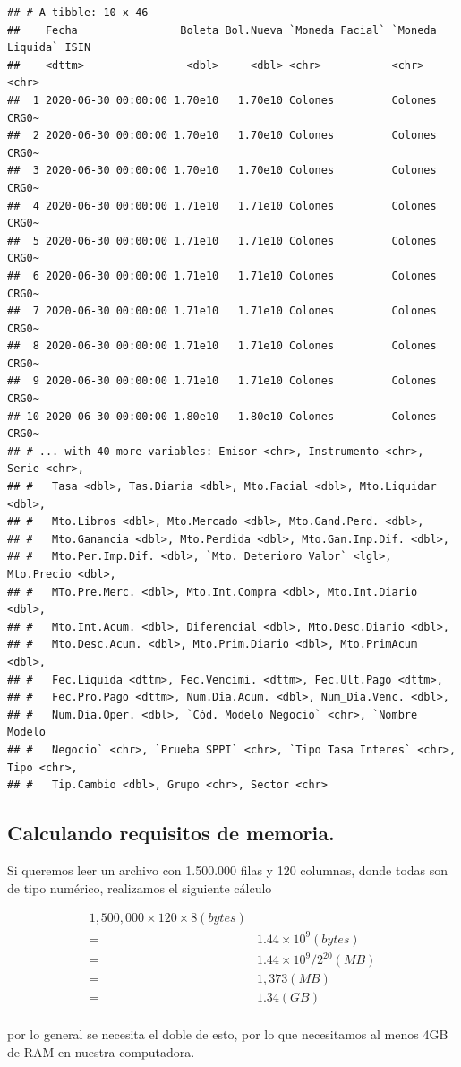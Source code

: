 \documentclass[
  12pt,
]{book}
\begin{document}
\begin{verbatim}
## # A tibble: 10 x 46
##    Fecha                Boleta Bol.Nueva `Moneda Facial` `Moneda Liquida` ISIN 
##    <dttm>                <dbl>     <dbl> <chr>           <chr>            <chr>
##  1 2020-06-30 00:00:00 1.70e10   1.70e10 Colones         Colones          CRG0~
##  2 2020-06-30 00:00:00 1.70e10   1.70e10 Colones         Colones          CRG0~
##  3 2020-06-30 00:00:00 1.70e10   1.70e10 Colones         Colones          CRG0~
##  4 2020-06-30 00:00:00 1.71e10   1.71e10 Colones         Colones          CRG0~
##  5 2020-06-30 00:00:00 1.71e10   1.71e10 Colones         Colones          CRG0~
##  6 2020-06-30 00:00:00 1.71e10   1.71e10 Colones         Colones          CRG0~
##  7 2020-06-30 00:00:00 1.71e10   1.71e10 Colones         Colones          CRG0~
##  8 2020-06-30 00:00:00 1.71e10   1.71e10 Colones         Colones          CRG0~
##  9 2020-06-30 00:00:00 1.71e10   1.71e10 Colones         Colones          CRG0~
## 10 2020-06-30 00:00:00 1.80e10   1.80e10 Colones         Colones          CRG0~
## # ... with 40 more variables: Emisor <chr>, Instrumento <chr>, Serie <chr>,
## #   Tasa <dbl>, Tas.Diaria <dbl>, Mto.Facial <dbl>, Mto.Liquidar <dbl>,
## #   Mto.Libros <dbl>, Mto.Mercado <dbl>, Mto.Gand.Perd. <dbl>,
## #   Mto.Ganancia <dbl>, Mto.Perdida <dbl>, Mto.Gan.Imp.Dif. <dbl>,
## #   Mto.Per.Imp.Dif. <dbl>, `Mto. Deterioro Valor` <lgl>, Mto.Precio <dbl>,
## #   MTo.Pre.Merc. <dbl>, Mto.Int.Compra <dbl>, Mto.Int.Diario <dbl>,
## #   Mto.Int.Acum. <dbl>, Diferencial <dbl>, Mto.Desc.Diario <dbl>,
## #   Mto.Desc.Acum. <dbl>, Mto.Prim.Diario <dbl>, Mto.PrimAcum <dbl>,
## #   Fec.Liquida <dttm>, Fec.Vencimi. <dttm>, Fec.Ult.Pago <dttm>,
## #   Fec.Pro.Pago <dttm>, Num.Dia.Acum. <dbl>, Num_Dia.Venc. <dbl>,
## #   Num.Dia.Oper. <dbl>, `Cód. Modelo Negocio` <chr>, `Nombre Modelo
## #   Negocio` <chr>, `Prueba SPPI` <chr>, `Tipo Tasa Interes` <chr>, Tipo <chr>,
## #   Tip.Cambio <dbl>, Grupo <chr>, Sector <chr>
\end{verbatim}

\hypertarget{calculando-requisitos-de-memoria.}{%
\subsection{\texorpdfstring{\textbf{Calculando requisitos de memoria}.}{Calculando requisitos de memoria.}}\label{calculando-requisitos-de-memoria.}}

Si queremos leer un archivo con 1.500.000 filas y 120 columnas, donde todas son de tipo numérico, realizamos el siguiente cálculo

\begin{align*}
1,500,000\times120\times 8 (bytes)\\
=&1.44\times10^9 (bytes)\\
=&1.44\times10^9 / 2^{20} (MB)\\
=&1,373 (MB)\\
=&1.34 (GB)\\
\end{align*}

por lo general se necesita el doble de esto, por lo que necesitamos al menos 4GB de RAM en nuestra computadora.
\end{document}
